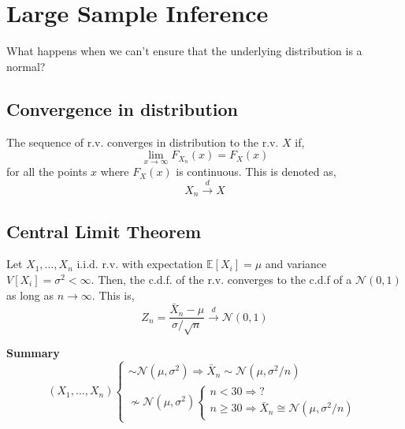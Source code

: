 \section{Large Sample Inference}
What happens when we can't ensure that the underlying distribution is a normal?

\subsection{Convergence in distribution}
The sequence of r.v. converges in distribution to the r.v. $X$ if,
\[ \lim_{x\rightarrow\infty}F_{X_n}(x) = F_X(x) \]
for all the points $x$ where $F_X(x)$ is continuous. This is denoted as,
\[ X_n \xrightarrow{d} X \]  

\subsection{Central Limit Theorem}
Let $X_1,\dots,X_n$ i.i.d. r.v. with expectation $\mathbb{E}[X_i] = \mu$ and variance $V[X_i]=\sigma^2 < \infty$. Then, the c.d.f. of the r.v. converges to the c.d.f 
of a $\mathcal{N}(0,1)$ as long as $n \rightarrow \infty$. This is,
\[ Z_n = \frac{\bar{X}_n - \mu}{\sigma/\sqrt{n}} \xrightarrow{d} \mathcal{N}(0,1)\]


\textbf{Summary}\\
\[
(X_1,\dots,X_n)
\begin{cases}
    \sim \mathcal{N}(\mu, \sigma^2) \Rightarrow \bar{X}_n \sim \mathcal{N}(\mu, \sigma^2/n)\\
    \nsim \mathcal{N}(\mu, \sigma^2)
        \begin{cases}
            n < 30 \Rightarrow \text{?}\\
            n \geq 30 \Rightarrow \bar{X}_n \cong \mathcal{N}(\mu, \sigma^2/n)
        \end{cases}
\end{cases}
\]










